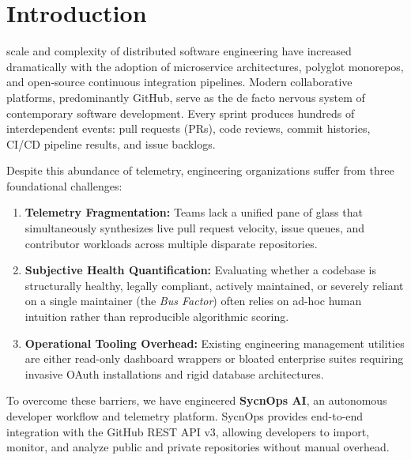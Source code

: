 \documentclass[conference]{IEEEtran}
\begin{document}
\section{Introduction}
 scale and complexity of distributed software engineering have increased dramatically with the adoption of microservice architectures, polyglot monorepos, and open-source continuous integration pipelines. Modern collaborative platforms, predominantly GitHub, serve as the de facto nervous system of contemporary software development. Every sprint produces hundreds of interdependent events: pull requests (PRs), code reviews, commit histories, CI/CD pipeline results, and issue backlogs.

Despite this abundance of telemetry, engineering organizations suffer from three foundational challenges:
\begin{enumerate}
    \item \textbf{Telemetry Fragmentation:} Teams lack a unified pane of glass that simultaneously synthesizes live pull request velocity, issue queues, and contributor workloads across multiple disparate repositories.
    \item \textbf{Subjective Health Quantification:} Evaluating whether a codebase is structurally healthy, legally compliant, actively maintained, or severely reliant on a single maintainer (the \textit{Bus Factor}) often relies on ad-hoc human intuition rather than reproducible algorithmic scoring.
    \item \textbf{Operational Tooling Overhead:} Existing engineering management utilities are either read-only dashboard wrappers or bloated enterprise suites requiring invasive OAuth installations and rigid database architectures.
\end{enumerate}

To overcome these barriers, we have engineered \textbf{SycnOps AI}, an autonomous developer workflow and telemetry platform. SycnOps provides end-to-end integration with the GitHub REST API v3, allowing developers to import, monitor, and analyze public and private repositories without manual overhead.
\end{document}
